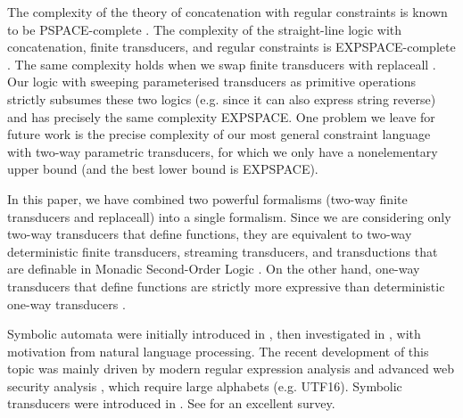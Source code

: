 The complexity of the theory of concatenation with regular constraints is
known to be PSPACE-complete \cite{Plandowski,J17}.
The complexity of the straight-line logic with concatenation, finite
transducers, and regular constraints is EXPSPACE-complete \cite{LB16}. The same 
complexity holds when we swap finite transducers with replaceall 
\cite{CCHLW18}. Our logic with sweeping parameterised transducers
as primitive operations strictly subsumes these two logics (e.g. since it can
also express string reverse) and has precisely the same complexity EXPSPACE.
One problem we leave for future work is the precise 
complexity of our most general constraint language with two-way parametric 
transducers, for which we only have a nonelementary upper bound (and the best
lower bound is EXPSPACE).

In this paper, we have combined two powerful formalisms 
(two-way finite transducers and replaceall) into a single formalism. Since we 
are considering
only two-way transducers that define functions, they are equivalent to 
two-way deterministic finite transducers, streaming transducers, and
transductions that are definable in Monadic Second-Order Logic
\cite{EH01,AC10,AD11}. On the other hand, one-way transducers that define 
functions are strictly more expressive than deterministic one-way transducers
\cite{Berstel}. 

Symbolic automata were initially introduced in \cite{Watson96}, then
investigated in \cite{NG01}, with motivation from natural language processing.
The recent development of this topic was mainly driven by modern regular
expression analysis and advanced web security analysis \cite{Vea13}, which
require large alphabets (e.g. UTF16). Symbolic transducers were introduced in 
\cite{symbolic-transducer}. See \cite{symbolic-transducer-power} for an 
excellent survey. %

